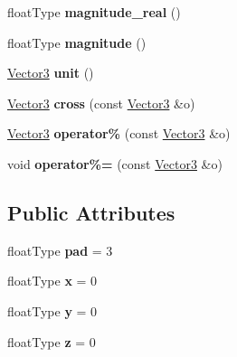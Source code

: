 \begin{DoxyCompactItemize}
\item 
\hypertarget{classVector3_a370eb6dbd0b95020a46de59ffd4742e4}{float\-Type {\bfseries magnitude\-\_\-real} ()}\label{classVector3_a370eb6dbd0b95020a46de59ffd4742e4}

\item 
\hypertarget{classVector3_a5adf92639aeeb6ef6ed50f91b3e2b270}{float\-Type {\bfseries magnitude} ()}\label{classVector3_a5adf92639aeeb6ef6ed50f91b3e2b270}

\item 
\hypertarget{classVector3_aa7e8f646ce4df5711f15ddaf07369e7a}{\hyperlink{classVector3}{Vector3} {\bfseries unit} ()}\label{classVector3_aa7e8f646ce4df5711f15ddaf07369e7a}

\item 
\hypertarget{classVector3_a9c8225d03ac52d4c302ff9845ca760d8}{\hyperlink{classVector3}{Vector3} {\bfseries cross} (const \hyperlink{classVector3}{Vector3} \&o)}\label{classVector3_a9c8225d03ac52d4c302ff9845ca760d8}

\item 
\hypertarget{classVector3_a2733bb0feb3bd9c85f900d89eb362ac2}{\hyperlink{classVector3}{Vector3} {\bfseries operator\%} (const \hyperlink{classVector3}{Vector3} \&o)}\label{classVector3_a2733bb0feb3bd9c85f900d89eb362ac2}

\item 
\hypertarget{classVector3_adab1932d7edfa02b0dc6d38bcf531ecb}{void {\bfseries operator\%=} (const \hyperlink{classVector3}{Vector3} \&o)}\label{classVector3_adab1932d7edfa02b0dc6d38bcf531ecb}

\end{DoxyCompactItemize}
\subsection*{Public Attributes}
\begin{DoxyCompactItemize}
\item 
\hypertarget{classVector3_a5f93328addd6414929117ddc6fab1fee}{float\-Type {\bfseries pad} = 3}\label{classVector3_a5f93328addd6414929117ddc6fab1fee}

\item 
\hypertarget{classVector3_a4c6656ee282aa9418ff5db40e8cea092}{float\-Type {\bfseries x} = 0}\label{classVector3_a4c6656ee282aa9418ff5db40e8cea092}

\item 
\hypertarget{classVector3_ac17517cf168e133212d0eb190dc24696}{float\-Type {\bfseries y} = 0}\label{classVector3_ac17517cf168e133212d0eb190dc24696}

\item 
\hypertarget{classVector3_a315896cafe2991bceabe38bca7c9d484}{float\-Type {\bfseries z} = 0}\label{classVector3_a315896cafe2991bceabe38bca7c9d484}

\end{DoxyCompactItemize}
